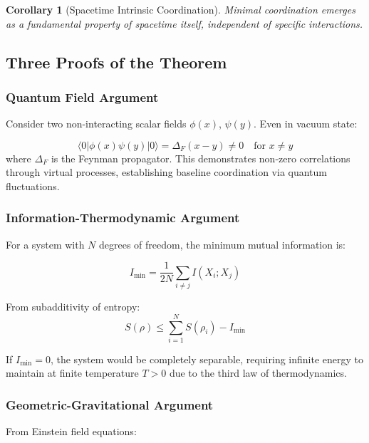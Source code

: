 \documentclass[11pt,a4paper]{article}
\newtheorem{corollary}{Corollary}
\begin{document}
\begin{corollary}[Spacetime Intrinsic Coordination]
	Minimal coordination emerges as a fundamental property of spacetime itself, independent of specific interactions.
\end{corollary}

\subsection{Three Proofs of the Theorem}

\subsubsection{Quantum Field Argument}

Consider two non-interacting scalar fields $\phi(x)$, $\psi(y)$. Even in vacuum state:

\begin{equation}
	\langle 0 | \phi(x) \psi(y) | 0 \rangle = \Delta_F(x-y) \neq 0 \quad \text{for } x \neq y
\end{equation}
where $\Delta_F$ is the Feynman propagator. This demonstrates non-zero correlations through virtual processes, establishing baseline coordination via quantum fluctuations.

\subsubsection{Information-Thermodynamic Argument}

For a system with $N$ degrees of freedom, the minimum mutual information is:

\begin{equation}
	I_{\min} = \frac{1}{2N} \sum_{i \neq j} I(X_i; X_j)
\end{equation}

From subadditivity of entropy:
\begin{equation}
	S(\rho) \leq \sum_{i=1}^N S(\rho_i) - I_{\min}
\end{equation}

If $I_{\min} = 0$, the system would be completely separable, requiring infinite energy to maintain at finite temperature $T > 0$ due to the third law of thermodynamics.

\subsubsection{Geometric-Gravitational Argument}

From Einstein field equations:
\end{document}

